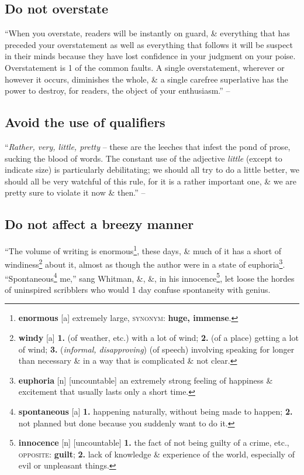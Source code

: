 \documentclass[oneside]{book}
\numberwithin{equation}{section}
\begin{document}
\subsection{Do not overstate}
``When you overstate, readers will be instantly on guard, \& everything that has preceded your overstatement as well as everything that follows it will be suspect in their minds because they have lost confidence in your judgment on your poise. Overstatement is 1 of the common faults. A single overstatement, wherever or however it occurs, diminishes the whole, \& a single carefree superlative has the power to destroy, for readers, the object of your enthusiasm.'' -- \cite[Chap. 5, Sect. 7, p. 84]{Strunk_White2019}

\subsection{Avoid the use of qualifiers}
``\textit{Rather, very, little, pretty} -- these are the leeches that infest the pond of prose, sucking the blood of words. The constant use of the adjective \textit{little} (except to indicate size) is particularly debilitating; we should all try to do a little better, we should all be very watchful of this rule, for it is a rather important one, \& we are pretty sure to violate it now \& then.'' -- \cite[Chap. 5, Sect. 8, p. 85]{Strunk_White2019}

\subsection{Do not affect a breezy manner}
``The volume of writing is enormous\footnote{\textbf{enormous} [a] extremely large, \textsc{synonym}: \textbf{huge, immense}.}, these days, \& much of it has a short of windiness\footnote{\textbf{windy} [a] \textbf{1.} (of weather, etc.) with a lot of wind; \textbf{2.} (of a place) getting a lot of wind; \textbf{3.} (\textit{informal, disapproving}) (of speech) involving speaking for longer than necessary \& in a way that is complicated \& not clear.} about it, almost as though the author were in a state of euphoria\footnote{\textbf{euphoria} [n] [uncountable] an extremely strong feeling of happiness \& excitement that usually lasts only a short time.}. ``Spontaneous\footnote{\textbf{spontaneous} [a] \textbf{1.} happening naturally, without being made to happen; \textbf{2.} not planned but done because you suddenly want to do it.} me,'' sang Whitman, \&, \&, in his innocence\footnote{\textbf{innocence} [n] [uncountable] \textbf{1.} the fact of not being guilty of a crime, etc., \textsc{opposite}: \textbf{guilt}; \textbf{2.} lack of knowledge \& experience of the world, especially of evil or unpleasant things.}, let loose the hordes of uninspired scribblers who would 1 day confuse spontaneity with genius.
\end{document}
